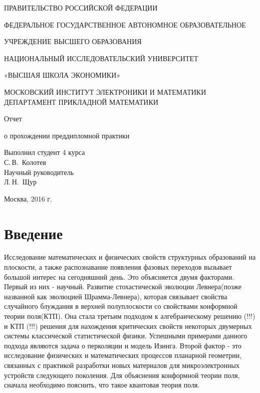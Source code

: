 \documentclass[12pt,a4paper]{article}
\begin{document}
	
	\begin{titlepage}
		\begin{center}
			\large
			ПРАВИТЕЛЬСТВО РОССИЙСКОЙ ФЕДЕРАЦИИ
			
			ФЕДЕРАЛЬНОЕ ГОСУДАРСТВЕННОЕ АВТОНОМНОЕ ОБРАЗОВАТЕЛЬНОЕ 
			
			УЧРЕЖДЕНИЕ ВЫСШЕГО ОБРАЗОВАНИЯ
			
			НАЦИОНАЛЬНЫЙ ИССЛЕДОВАТЕЛЬСКИЙ УНИВЕРСИТЕТ
			
			«ВЫСШАЯ ШКОЛА ЭКОНОМИКИ»\\[12pt]
			\vspace{0.25cm}
			
			МОСКОВСКИЙ ИНСТИТУТ ЭЛЕКТРОНИКИ И МАТЕМАТИКИ
			ДЕПАРТАМЕНТ ПРИКЛАДНОЙ МАТЕМАТИКИ
			
			\vspace{2cm}
			
			{\large Отчет 
				
				о прохождении преддипломной практики}
			\bigskip
		\end{center}
		\vfill
		
		\hfill\begin{minipage}{0.35\textwidth}
			Выполнил студент 4 курса\\
			С.\,В.~Колотев\\
			
			
			Научный руководитель\\
			Л.\,Н.~Щур\\
		\end{minipage}%
		\bigskip
		\vfill
		
		
		\begin{center}
			Москва, 2016 г.
		\end{center}
	\end{titlepage}
	
	\renewcommand\contentsname{Оглавление}
	\section{Введение}
	
	\par Исследование математических и физических свойств структурных образований на плоскости, а также распознавание появления фазовых переходов вызывает большой интерес на сегодняшний день. Это объясняется двумя факторами. Первый из них - научный. Развитие стохастической эволюции Левнера(позже названной как эволюцией Шрамма-Левнера), которая связывает свойства случайного блуждания в верхней полуплоскости со свойствами конформной теории поля(КТП). Она стала третьим подходом к алгебраическому решению (!!!) и КТП (!!!) решения для нахождения критических свойств некоторых двумерных системы классической статистической физики. Успешными примерами данного подхода являются задача о перколяции и модель Изинга. Второй фактор - это исследование физических и математических процессов планарной геометрии, связанных с практикой разработки новых материалов для микроэлектронных устройств следующего поколения. Для объяснения конформной теории поля, сначала необходимо пояснить, что такое квантовая теория поля. 
	
\end{document}
